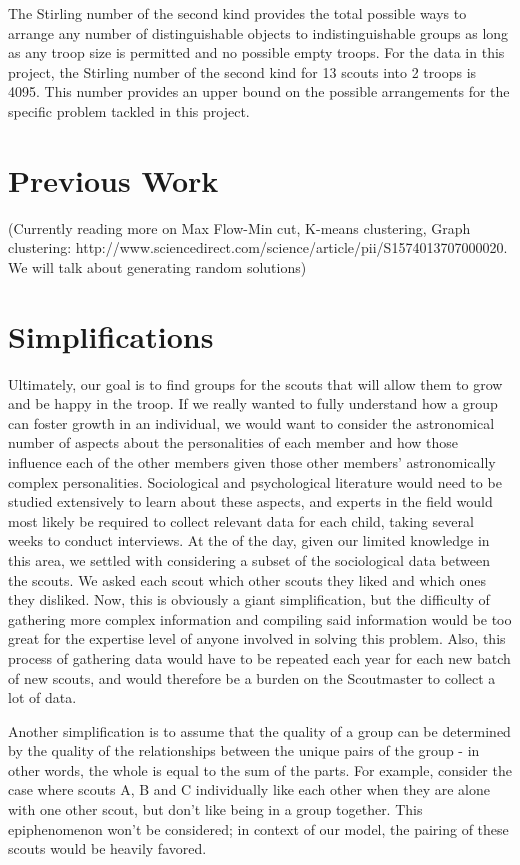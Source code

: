 \documentclass{amsart}
\theoremstyle{definition}
\theoremstyle{remark}
\numberwithin{equation}{section}
\begin{document}
The Stirling number of the second kind provides the total possible ways to arrange any number of distinguishable objects to indistinguishable groups as long as any troop size is permitted and no possible empty troops. For the data in this project, the Stirling number of the second kind for 13 scouts into 2 troops is 4095. This number provides an upper bound on the possible arrangements for the specific problem tackled in this project.

\section*{Previous Work}
(Currently reading more on Max Flow-Min cut, K-means clustering, Graph clustering: http://www.sciencedirect.com/science/article/pii/S1574013707000020. We will talk about generating random solutions)

\section*{Simplifications}
Ultimately, our goal is to find groups for the scouts that will allow them to grow and be happy in the troop. If we really wanted to fully understand how a group can foster growth in an individual, we would want to consider the astronomical number of aspects about the personalities of each member and how those influence each of the other members given those other members’ astronomically complex personalities. Sociological and psychological literature would need to be studied extensively to learn about these aspects, and experts in the field would most likely be required to collect relevant data for each child, taking several weeks to conduct interviews. At the of the day, given our limited knowledge in this area, we settled with considering a subset of the sociological data between the scouts. We asked each scout which other scouts they liked and which ones they disliked. Now, this is obviously a giant simplification, but the difficulty of gathering more complex information and compiling said information would be too great for the expertise level of anyone involved in solving this problem. Also, this process of gathering data would have to be repeated each year for each new batch of new scouts, and would therefore be a burden on the Scoutmaster to collect a lot of data.

Another simplification is to assume that the quality of a group can be determined by the quality of the relationships between the unique pairs of the group - in other words, the whole is equal to the sum of the parts. For example, consider the case where scouts A, B and C individually like each other when they are alone with one other scout, but don’t like being in a group together. This epiphenomenon won’t be considered; in context of our model, the pairing of these scouts would be heavily favored. 
\end{document}
